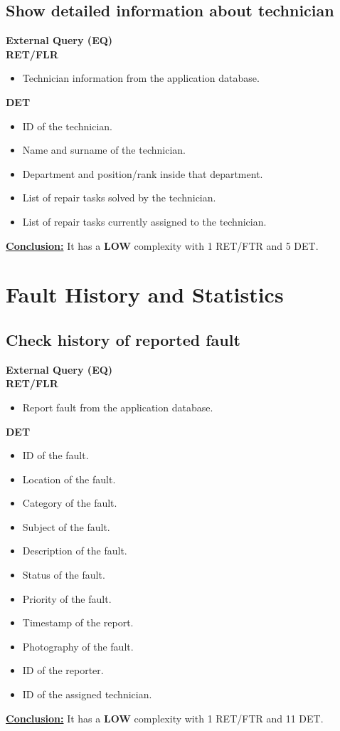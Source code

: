 \subsection{Show detailed information about technician}
\textbf{External Query (EQ)} \\ 
\textbf{RET/FLR}
\begin{itemize}
\item Technician information from the application database.
\end{itemize}
\textbf{DET}
\begin{itemize}
\item ID of the technician.
\item Name and surname of the technician.
\item Department and position/rank inside that department.
\item List of repair tasks solved by the technician.
\item List of repair tasks currently assigned to the technician.
\end{itemize}
\textbf{\underline{Conclusion:}} It has a \textbf{LOW} complexity with 1 RET/FTR and 5 DET.



\section{Fault History and Statistics}

\subsection{Check history of reported fault}
\textbf{External Query (EQ)} \\ 
\textbf{RET/FLR}
\begin{itemize}
\item Report fault from the application database.
\end{itemize}
\textbf{DET}
\begin{itemize}
\item ID of the fault.
\item Location of the fault.
\item Category of the fault.
\item Subject of the fault.
\item Description of the fault.
\item Status of the fault.
\item Priority of the fault.
\item Timestamp of the report.
\item Photography of the fault.
\item ID of the reporter.
\item ID of the assigned technician.
\end{itemize}
\textbf{\underline{Conclusion:}} It has a \textbf{LOW} complexity with 1 RET/FTR and 11 DET.


